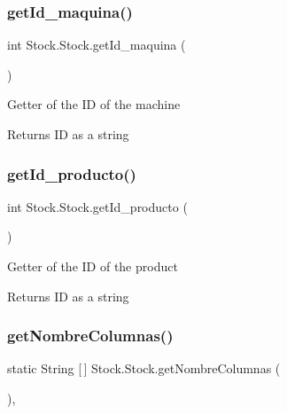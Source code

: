 \subsubsection{\texorpdfstring{get\+Id\+\_\+maquina()}{getId\_maquina()}}
{\footnotesize\ttfamily int Stock.\+Stock.\+get\+Id\+\_\+maquina (\begin{DoxyParamCaption}{ }\end{DoxyParamCaption})\hspace{0.3cm}{\ttfamily [inline]}}

Getter of the ID of the machine

\begin{DoxyReturn}{Returns}
ID as a string 
\end{DoxyReturn}
\mbox{\label{class_stock_1_1_stock_aa5fac816e624d7e89c4f9f9d081251dc}} 
\subsubsection{\texorpdfstring{get\+Id\+\_\+producto()}{getId\_producto()}}
{\footnotesize\ttfamily int Stock.\+Stock.\+get\+Id\+\_\+producto (\begin{DoxyParamCaption}{ }\end{DoxyParamCaption})\hspace{0.3cm}{\ttfamily [inline]}}

Getter of the ID of the product

\begin{DoxyReturn}{Returns}
ID as a string 
\end{DoxyReturn}
\mbox{\label{class_stock_1_1_stock_a5007745c69c26fcf79c85b18497c7b43}} 
\subsubsection{\texorpdfstring{get\+Nombre\+Columnas()}{getNombreColumnas()}}
{\footnotesize\ttfamily static String \mbox{[}$\,$\mbox{]} Stock.\+Stock.\+get\+Nombre\+Columnas (\begin{DoxyParamCaption}{ }\end{DoxyParamCaption})\hspace{0.3cm}{\ttfamily [inline]}, {\ttfamily [static]}}

